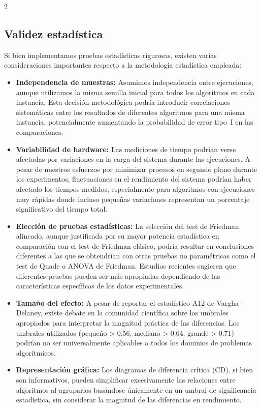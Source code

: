\documentclass[10pt,a4paper]{extarticle}
\begin{document}
\begin{multicols}{2}
\subsection{Validez estadística}
Si bien implementamos pruebas estadísticas rigurosas, existen varias consideraciones importantes respecto a la metodología estadística empleada:
\begin{itemize}
\item \textbf{Independencia de muestras:} Asumimos independencia entre ejecuciones, aunque utilizamos la misma semilla inicial para todos los algoritmos en cada instancia. Esta decisión metodológica podría introducir correlaciones sistemáticas entre los resultados de diferentes algoritmos para una misma instancia, potencialmente aumentando la probabilidad de error tipo~I en las comparaciones.
\item \textbf{Variabilidad de hardware:} Las mediciones de tiempo podrían verse afectadas por variaciones en la carga del sistema durante las ejecuciones. A pesar de nuestros esfuerzos por minimizar procesos en segundo plano durante los experimentos, fluctuaciones en el rendimiento del sistema podrían haber afectado los tiempos medidos, especialmente para algoritmos con ejecuciones muy rápidas donde incluso pequeñas variaciones representan un porcentaje significativo del tiempo total.
\item \textbf{Elección de pruebas estadísticas:} La selección del test de Friedman alineado, aunque justificada por su mayor potencia estadística en comparación con el test de Friedman clásico, podría resultar en conclusiones diferentes a las que se obtendrían con otras pruebas no paramétricas como el test de Quade o ANOVA de Friedman. Estudios recientes sugieren que diferentes pruebas pueden ser más apropiadas dependiendo de las características específicas de los datos experimentales.
\item \textbf{Tamaño del efecto:} A pesar de reportar el estadístico A12 de Vargha-Delaney, existe debate en la comunidad científica sobre los umbrales apropiados para interpretar la magnitud práctica de las diferencias. Los umbrales utilizados (pequeño > 0.56, mediano > 0.64, grande > 0.71) podrían no ser universalmente aplicables a todos los dominios de problemas algorítmicos.
\item \textbf{Representación gráfica:} Los diagramas de diferencia crítica (CD), si bien son informativos, pueden simplificar excesivamente las relaciones entre algoritmos al agruparlos basándose únicamente en un umbral de significancia estadística, sin considerar la magnitud de las diferencias en rendimiento.
\end{itemize}


\end{multicols}
\end{document}
